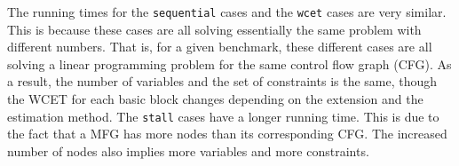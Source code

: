 The running times for the {\tt sequential} cases and the {\tt wcet} cases are very
similar. This is because these cases are all solving essentially the same
problem with different numbers. That is, for a given benchmark, these different
cases are all solving a linear programming problem for the same control flow
graph (CFG). As a result, the number of variables and the set of
constraints is the same, though the WCET for each basic block changes depending
on the extension and the estimation method. The {\tt stall} cases have a longer
running time.
This is due to the fact that a MFG has more nodes than its corresponding CFG.
The increased number of nodes also implies more variables and more constraints.


